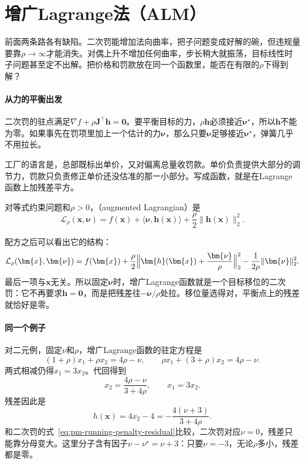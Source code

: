 \section{增广Lagrange法（ALM）}
\label{sec:pm-alm}

前面两条路各有缺陷。二次罚能增加法向曲率，把子问题变成好解的碗，但违规量要靠$\rho\to\infty$才能消失。对偶上升不增加任何曲率，步长稍大就振荡，目标线性时子问题甚至定不出解。把价格和罚款放在同一个函数里，能否在有限的$\rho$下得到解？

\paragraph{从力的平衡出发}
二次罚的驻点满足$\nabla f+\rho\bm{J}^\top\bm{h}=\bm{0}$。要平衡目标的力，$\rho\bm{h}$必须接近$\bm{\nu}^\star$，所以$\bm{h}$不能为零。如果事先在罚项里加上一个估计的力$\bm{\nu}$，那么只要$\bm{\nu}$足够接近$\bm{\nu}^\star$，弹簧几乎不用拉长。

工厂的语言是，总部既标出单价，又对偏离总量收罚款。单价负责提供大部分的调节力，罚款只负责修正单价还没估准的那一小部分。写成函数，就是在Lagrange函数上加残差平方。

\begin{definition}[增广Lagrange函数]
\label{def:pm-al}
对等式约束问题和$\rho>0$，（augmented Lagrangian）是
\begin{equation}
 \mathcal{L}_\rho(\bm{x},\bm{\nu})=f(\bm{x})+\langle\bm{\nu},\bm{h}(\bm{x})\rangle+\frac{\rho}{2}\lVert\bm{h}(\bm{x})\rVert_2^2 .
 \label{eq:pm-al}
\end{equation}
\end{definition}

配方之后可以看出它的结构：
\begin{equation}
 \mathcal{L}_\rho(\bm{x},\bm{\nu})=f(\bm{x})+\frac{\rho}{2}\Bigl\lVert\bm{h}(\bm{x})+\frac{\bm{\nu}}{\rho}\Bigr\rVert_2^2-\frac{1}{2\rho}\lVert\bm{\nu}\rVert_2^2 .
 \label{eq:pm-al-square}
\end{equation}
最后一项与$\bm{x}$无关。所以固定$\bm{\nu}$时，增广Lagrange函数就是一个目标移位的二次罚：它不再要求$\bm{h}=\bm{0}$，而是把残差往$-\bm{\nu}/\rho$处拉。移位量选得对，平衡点上的残差就恰好是零。

\paragraph{同一个例子}
对二元例，固定$\nu$和$\rho$，增广Lagrange函数的驻定方程是
\[
 (1+\rho)x_1+\rho x_2=4\rho-\nu,\qquad \rho x_1+(3+\rho)x_2=4\rho-\nu .
\]
两式相减仍得$x_1=3x_2$。代回得到
\begin{equation}
 x_2=\frac{4\rho-\nu}{3+4\rho},\qquad x_1=3x_2 .
 \label{eq:pm-running-al-solution}
\end{equation}
残差因此是
\begin{equation}
 h(\bm{x})=4x_2-4=-\frac{4(\nu+3)}{3+4\rho}.
 \label{eq:pm-running-al-residual}
\end{equation}
和二次罚的式~\eqref{eq:pm-running-penalty-residual}比较，二次罚对应$\nu=0$，残差只能靠分母变大。这里分子含有因子$\nu-\nu^\star=\nu+3$：只要$\nu=-3$，无论$\rho$多小，残差都是零。

